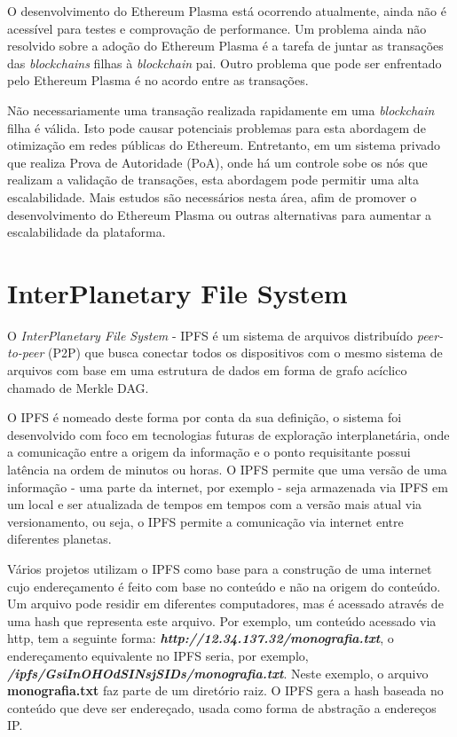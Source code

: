 \documentclass[tcc,capa]{texufpel}
\begin{document}
    O desenvolvimento do Ethereum Plasma está ocorrendo atualmente, ainda não é acessível para testes e comprovação de performance. Um problema ainda não resolvido sobre a adoção do Ethereum Plasma é a tarefa de juntar as transações das \textit{blockchains} filhas à \textit{blockchain} pai. Outro problema que pode ser enfrentado pelo Ethereum Plasma é no acordo entre as transações.
    
    Não necessariamente uma transação realizada rapidamente em uma \textit{blockchain} filha é válida. Isto pode causar potenciais problemas para esta abordagem de otimização em redes públicas do Ethereum. Entretanto, em um sistema privado que realiza Prova de Autoridade (PoA), onde há um controle sobe os nós que realizam a validação de transações, esta abordagem pode permitir uma alta escalabilidade. Mais estudos são necessários nesta área, afim de promover o desenvolvimento do Ethereum Plasma ou outras alternativas para aumentar a escalabilidade da plataforma.

    
    
\chapter{InterPlanetary File System}\label{chap:ipfs}

    O \textit{InterPlanetary File System} - IPFS é um sistema de arquivos distribuído \textit{peer-to-peer} (P2P) que busca conectar todos os dispositivos com o mesmo sistema de arquivos com base em uma estrutura de dados em forma de grafo acíclico chamado de Merkle DAG.
    
    O IPFS é nomeado deste forma por conta da sua definição, o sistema foi desenvolvido com foco em tecnologias futuras de exploração interplanetária, onde a comunicação entre a origem da informação e o ponto requisitante possui latência na ordem de minutos ou horas. O IPFS permite que uma versão de uma informação - uma parte da internet, por exemplo - seja armazenada via IPFS em um local e ser atualizada de tempos em tempos com a versão mais atual via versionamento, ou seja, o IPFS permite a comunicação via internet entre diferentes planetas.
    
    Vários projetos utilizam o IPFS como base para a construção de uma internet cujo endereçamento é feito com base no conteúdo e não na origem do conteúdo. Um arquivo pode residir em diferentes computadores, mas é acessado através de uma hash que representa este arquivo. Por exemplo, um conteúdo acessado via http, tem a seguinte forma: \textbf{\textit{http://12.34.137.32/monografia.txt}}, o endereçamento equivalente no IPFS seria, por exemplo, \textbf{\textit{/ipfs/GsiInOHOdSINsjSIDs/monografia.txt}}. Neste exemplo, o arquivo \textbf{monografia.txt} faz parte de um diretório raiz. O IPFS gera a hash baseada no conteúdo que deve ser endereçado, usada como forma de abstração a endereços IP.
    
\end{document}
